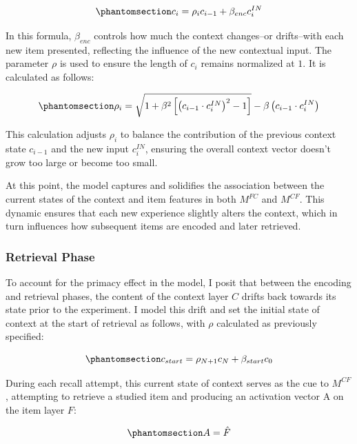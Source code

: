 \documentclass[
  letterpaper,
  11pt,
  english,
  singlespacing,
  headsepline]{MastersDoctoralThesis}
\begin{document}
\begin{equation}\phantomsection\label{eq-13}{
c_i = \rho_i c_{i-1} + \beta_{enc} c_{i}^{IN}
}\end{equation}

In this formula, \(\beta_{enc}\) controls how much the context
changes--or drifts--with each new item presented, reflecting the
influence of the new contextual input. The parameter \(\rho\) is used to
ensure the length of \(c_i\) remains normalized at \(1\). It is
calculated as follows:

\begin{equation}\phantomsection\label{eq-14}{
\rho_i = \sqrt{1 + \beta^2\left[\left(c_{i-1} \cdot c^{IN}_i\right)^2 - 1\right]} - \beta\left(c_{i-1} \cdot c^{IN}_i\right)
}\end{equation}

This calculation adjusts \(\rho_i\) to balance the contribution of the
previous context state \(c_{i-1}\) and the new input \(c^{IN}_i\),
ensuring the overall context vector doesn't grow too large or become too
small.

At this point, the model captures and solidifies the association between
the current states of the context and item features in both \(M^{FC}\)
and \(M^{CF}\). This dynamic ensures that each new experience slightly
alters the context, which in turn influences how subsequent items are
encoded and later retrieved.

\subsubsection{Retrieval Phase}\label{retrieval-phase}

To account for the primacy effect in the model, I posit that between the
encoding and retrieval phases, the content of the context layer \(C\)
drifts back towards its state prior to the experiment. I model this
drift and set the initial state of context at the start of retrieval as
follows, with \(\rho\) calculated as previously specified:

\begin{equation}\phantomsection\label{eq-15}{
c_{start} = \rho_{N+1}c_N + \beta_{start}c_0
}\end{equation}

During each recall attempt, this current state of context serves as the
cue to \(M^{CF}\), attempting to retrieve a studied item and producing
an activation vector A on the item layer \(F\):

\begin{equation}\phantomsection\label{eq-155}{
A = \hat{F}
}\end{equation}
\end{document}

